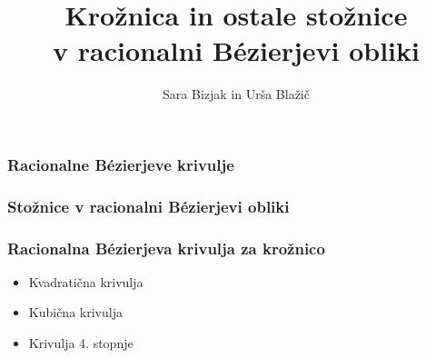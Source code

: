 \documentclass[a4paper, 12pt]{beamer}
\title[CAGD projekt]{Krožnica in ostale stožnice \\
v racionalni B\'ezierjevi obliki
}
\author{Sara Bizjak in Urša Blažič}
\institute[FMF]{Fakulteta za matematiko in fiziko}
\begin{document}
\titlepage


\begin{frame}
\frametitle{Racionalne B\'ezierjeve krivulje}

\end{frame}


\begin{frame}
\frametitle{Stožnice v racionalni B\'ezierjevi obliki}

\end{frame}



\begin{frame}
\frametitle{Racionalna B\'ezierjeva krivulja za krožnico}

\begin{itemize}
    \item Kvadratična krivulja
    \item Kubična krivulja
    \item Krivulja 4. stopnje
\end{itemize}

\end{frame}


\end{document}
